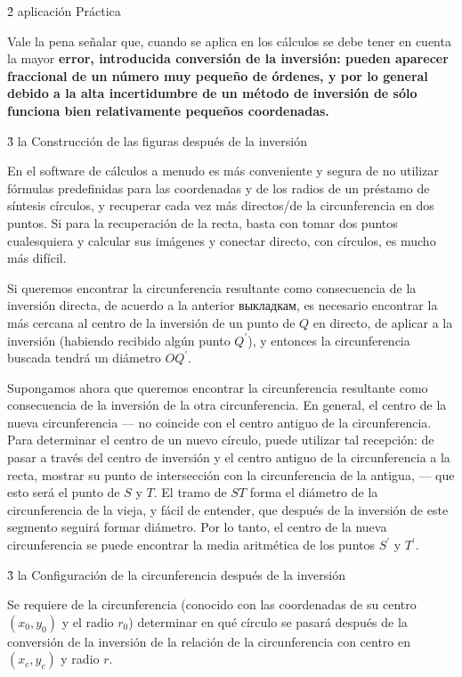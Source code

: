 \h2{ aplicación Práctica }

Vale la pena señalar que, cuando se aplica en los cálculos se debe tener en cuenta la mayor \bf{error}, introducida conversión de la inversión: pueden aparecer fraccional de un número muy pequeño de órdenes, y por lo general debido a la alta incertidumbre de un método de inversión de sólo funciona bien relativamente pequeños coordenadas.


\h3{ la Construcción de las figuras después de la inversión }

En el software de cálculos a menudo es más conveniente y segura de no utilizar fórmulas predefinidas para las coordenadas y de los radios de un préstamo de síntesis círculos, y recuperar cada vez más directos/de la circunferencia en dos puntos. Si para la recuperación de la recta, basta con tomar dos puntos cualesquiera y calcular sus imágenes y conectar directo, con círculos, es mucho más difícil.

Si queremos encontrar la circunferencia resultante como consecuencia de la inversión directa, de acuerdo a la anterior выкладкам, es necesario encontrar la más cercana al centro de la inversión de un punto de $Q$ en directo, de aplicar a la inversión (habiendo recibido algún punto $Q^\prime$), y entonces la circunferencia buscada tendrá un diámetro $O Q^\prime$.

Supongamos ahora que queremos encontrar la circunferencia resultante como consecuencia de la inversión de la otra circunferencia. En general, el centro de la nueva circunferencia --- no coincide con el centro antiguo de la circunferencia. Para determinar el centro de un nuevo círculo, puede utilizar tal recepción: de pasar a través del centro de inversión y el centro antiguo de la circunferencia a la recta, mostrar su punto de intersección con la circunferencia de la antigua, --- que esto será el punto de $S$ y $T$. El tramo de $ST$ forma el diámetro de la circunferencia de la vieja, y fácil de entender, que después de la inversión de este segmento seguirá formar diámetro. Por lo tanto, el centro de la nueva circunferencia se puede encontrar la media aritmética de los puntos $S^\prime$ y $T^\prime$.


\h3{ la Configuración de la circunferencia después de la inversión }

Se requiere de la circunferencia (conocido con las coordenadas de su centro $(x_0,y_0)$ y el radio $r_0$) determinar en qué círculo se pasará después de la conversión de la inversión de la relación de la circunferencia con centro en $(x_c,y_c)$ y radio $r$.

